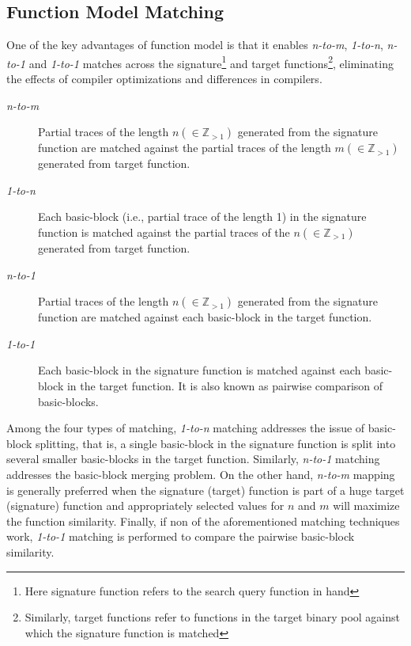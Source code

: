 \subsection{Function Model Matching} \label{subsec:fun_mod_mat}

One of the key advantages of function model is that it enables \textit{n-to-m}, \textit{1-to-n}, \textit{n-to-1} and \textit{1-to-1} matches across the signature\footnote{Here signature function refers to the search query function in hand} and target functions\footnote{Similarly, target functions refer to functions in the target binary pool against which the signature function is matched}, eliminating the effects of compiler optimizations and differences in compilers.

\begin{description}
  \item[\textit{n-to-m}] Partial traces of the length $n (\in\mathbb Z_{> 1})$ generated from the signature function are matched against the partial traces of the length $m (\in\mathbb Z_{> 1})$ generated from target function.
  \item[\textit{1-to-n}] Each basic-block (i.e., partial trace of the length 1) in the signature function is matched against the partial traces of the $n (\in\mathbb Z_{> 1})$ generated from target function.
  \item[\textit{n-to-1}] Partial traces of the length $n (\in\mathbb Z_{> 1})$ generated from the signature function are matched against each basic-block in the target function.
  \item[\textit{1-to-1}] Each basic-block in the signature function is matched against each basic-block in the target function. It is also known as pairwise comparison of basic-blocks.
\end{description}

Among the four types of matching, \textit{1-to-n} matching addresses the issue of basic-block splitting, that is, a single basic-block in the signature function is split into several smaller basic-blocks in the target function. Similarly, \textit{n-to-1} matching addresses the basic-block merging problem. On the other hand, \textit{n-to-m} mapping is generally preferred when the signature (target) function is part of a huge target (signature) function and appropriately selected values for $n$ and $m$ will maximize the function similarity. Finally, if non of the aforementioned matching techniques work, \textit{1-to-1} matching is performed to compare the pairwise basic-block similarity.

